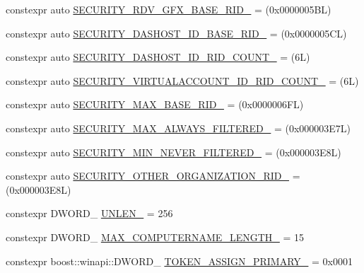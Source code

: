 \begin{DoxyCompactItemize}
\item 
constexpr auto \mbox{\hyperlink{namespaceboost_1_1winapi_ad5696cf0651722d8e31b262670b0a924}{S\+E\+C\+U\+R\+I\+T\+Y\+\_\+\+R\+D\+V\+\_\+\+G\+F\+X\+\_\+\+B\+A\+S\+E\+\_\+\+R\+I\+D\+\_\+}} = (0x0000005\+B\+L)
\item 
constexpr auto \mbox{\hyperlink{namespaceboost_1_1winapi_a055347986b1eee124f7133e7094517da}{S\+E\+C\+U\+R\+I\+T\+Y\+\_\+\+D\+A\+S\+H\+O\+S\+T\+\_\+\+I\+D\+\_\+\+B\+A\+S\+E\+\_\+\+R\+I\+D\+\_\+}} = (0x0000005\+C\+L)
\item 
constexpr auto \mbox{\hyperlink{namespaceboost_1_1winapi_aeb9a293d8545a167a92e4d79d2830a64}{S\+E\+C\+U\+R\+I\+T\+Y\+\_\+\+D\+A\+S\+H\+O\+S\+T\+\_\+\+I\+D\+\_\+\+R\+I\+D\+\_\+\+C\+O\+U\+N\+T\+\_\+}} = (6\+L)
\item 
constexpr auto \mbox{\hyperlink{namespaceboost_1_1winapi_a2d691283f1b82a1c9334b323e68451f4}{S\+E\+C\+U\+R\+I\+T\+Y\+\_\+\+V\+I\+R\+T\+U\+A\+L\+A\+C\+C\+O\+U\+N\+T\+\_\+\+I\+D\+\_\+\+R\+I\+D\+\_\+\+C\+O\+U\+N\+T\+\_\+}} = (6\+L)
\item 
constexpr auto \mbox{\hyperlink{namespaceboost_1_1winapi_a545ba75b8dbf42c28af967960ee62457}{S\+E\+C\+U\+R\+I\+T\+Y\+\_\+\+M\+A\+X\+\_\+\+B\+A\+S\+E\+\_\+\+R\+I\+D\+\_\+}} = (0x0000006\+F\+L)
\item 
constexpr auto \mbox{\hyperlink{namespaceboost_1_1winapi_abb7139239b958de3779dfc001c1c9734}{S\+E\+C\+U\+R\+I\+T\+Y\+\_\+\+M\+A\+X\+\_\+\+A\+L\+W\+A\+Y\+S\+\_\+\+F\+I\+L\+T\+E\+R\+E\+D\+\_\+}} = (0x000003\+E7\+L)
\item 
constexpr auto \mbox{\hyperlink{namespaceboost_1_1winapi_ac8a3354f0531bc2d0576820d72302fff}{S\+E\+C\+U\+R\+I\+T\+Y\+\_\+\+M\+I\+N\+\_\+\+N\+E\+V\+E\+R\+\_\+\+F\+I\+L\+T\+E\+R\+E\+D\+\_\+}} = (0x000003\+E8\+L)
\item 
constexpr auto \mbox{\hyperlink{namespaceboost_1_1winapi_a79e5ea4f036b860b9b83a0ddf4583689}{S\+E\+C\+U\+R\+I\+T\+Y\+\_\+\+O\+T\+H\+E\+R\+\_\+\+O\+R\+G\+A\+N\+I\+Z\+A\+T\+I\+O\+N\+\_\+\+R\+I\+D\+\_\+}} = (0x000003\+E8\+L)
\item 
constexpr D\+W\+O\+R\+D\+\_\+ \mbox{\hyperlink{namespaceboost_1_1winapi_a95679cb78557bc41725c551f27cd7de7}{U\+N\+L\+E\+N\+\_\+}} = 256
\item 
constexpr D\+W\+O\+R\+D\+\_\+ \mbox{\hyperlink{namespaceboost_1_1winapi_ad0751d998f3495f6959457e2f33a6036}{M\+A\+X\+\_\+\+C\+O\+M\+P\+U\+T\+E\+R\+N\+A\+M\+E\+\_\+\+L\+E\+N\+G\+T\+H\+\_\+}} = 15
\item 
constexpr boost\+::winapi\+::\+D\+W\+O\+R\+D\+\_\+ \mbox{\hyperlink{namespaceboost_1_1winapi_a13cefc4e4a8bd197ce2fa95ce25f47e4}{T\+O\+K\+E\+N\+\_\+\+A\+S\+S\+I\+G\+N\+\_\+\+P\+R\+I\+M\+A\+R\+Y\+\_\+}} = 0x0001

\end{DoxyCompactItemize}
